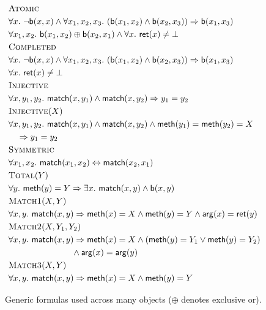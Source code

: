 \begin{figure}

  \footnotesize
  \begin{align*}
    & \textsc{Atomic} \\
    & \forall x.\ \neg {\sf b}(x,x)\land \forall x_1,x_2,x_3.\ ({\sf b}(x_1,x_2) \land {\sf b}(x_2,x_3)) \implies {\sf b}(x_1,x_3) \\
    & \forall x_1,x_2.\ 
      {\sf b}(x_1,x_2) \oplus {\sf b}(x_2,x_1) \land \forall x.\ {\sf ret}(x) \neq \bot 
    \\
    & \textsc{Completed} \\
    & \forall x.\ \neg {\sf b}(x,x)\land \forall x_1,x_2,x_3.\ ({\sf b}(x_1,x_2) \land {\sf b}(x_2,x_3)) \implies {\sf b}(x_1,x_3) \\
    & \forall x.\ {\sf ret}(x) \neq \bot
    \\
    & \textsc{Injective} \\
    & \forall x, y_1, y_2.\ {\sf match}(x, y_1) \land {\sf match}(x, y_2) \implies y_1 = y_2
    \\
    & \textsc{Injective}(X) \\
    & \forall x, y_1, y_2.\ {\sf match}(x, y_1) \land {\sf match}(x, y_2) \land {\sf meth}(y_1)={\sf meth}(y_2)=X \\
    &\quad \implies y_1 = y_2
    \\
    & \textsc{Symmetric} \\
    & \forall x_1,x_2.\ {\sf match}(x_1,x_2) \Leftrightarrow {\sf match}(x_2,x_1)
    \\
    & \textsc{Total}(Y) \\
    & \forall y.\ {\sf meth}(y) = Y \implies \exists x.\ {\sf match}(x,y) \land {\sf b}(x,y)
    \\
    & \textsc{Match1}(X,Y) \\
    & \forall x, y.\ {\sf match}(x,y) \implies 
        {\sf meth}(x) = X \land {\sf meth}(y) = Y \land {\sf arg}(x) = {\sf ret}(y)
    \\
    & \textsc{Match2}(X,Y_1,Y_2) \\
    & \forall x, y.\ {\sf match}(x,y) \implies 
      {\sf meth}(x) = X \land ({\sf meth}(y) = Y_1 \vee {\sf meth}(y) = Y_2) \\
      & \hspace{2.6cm}\land {\sf arg}(x) = {\sf arg}(y)
    \\
    & \textsc{Match3}(X,Y) \\
      & \forall x, y.\ 
        {\sf match}(x,y) \implies {\sf meth}(x) = X \land {\sf meth}(y) = Y
  \end{align*}

  \caption{Generic formulas used across many objects ($\oplus$ denotes exclusive or).}
  \label{fig:formulas:common}

\end{figure}

